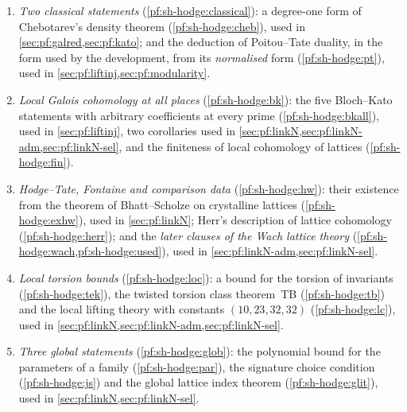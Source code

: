 \begin{enumerate}[label=(\roman*)]
\item \emph{Two classical statements} (\cref{pf:sh-hodge:classical}): a degree-one form of Chebotarev's density
  theorem (\cref{pf:sh-hodge:cheb}), used in \cref{sec:pf:galred,sec:pf:kato}; and the deduction of Poitou--Tate
  duality, in the form used by the development, from its \emph{normalised} form (\cref{pf:sh-hodge:pt}), used in
  \cref{sec:pf:liftinj,sec:pf:modularity}.
\item \emph{Local Galois cohomology at all places} (\cref{pf:sh-hodge:bk}): the five Bloch--Kato statements with
  arbitrary coefficients at every prime (\cref{pf:sh-hodge:bkall}), used in \cref{sec:pf:liftinj}, two corollaries
  used in \cref{sec:pf:linkN,sec:pf:linkN-adm,sec:pf:linkN-sel}, and the finiteness of local cohomology of lattices
  (\cref{pf:sh-hodge:fin}).
\item \emph{Hodge--Tate, Fontaine and comparison data} (\cref{pf:sh-hodge:hw}): their existence from the theorem of
  Bhatt--Scholze on crystalline lattices (\cref{pf:sh-hodge:exhw}), used in \cref{sec:pf:linkN}; Herr's description of
  lattice cohomology (\cref{pf:sh-hodge:herr}); and the \emph{later clauses of the Wach lattice theory}
  (\cref{pf:sh-hodge:wach,pf:sh-hodge:used}), used in \cref{sec:pf:linkN-adm,sec:pf:linkN-sel}.
\item \emph{Local torsion bounds} (\cref{pf:sh-hodge:loc}): a bound for the torsion of invariants
  (\cref{pf:sh-hodge:tek}), the twisted torsion class theorem~TB (\cref{pf:sh-hodge:tb}) and the local lifting theory with
  constants $(10,23,32,32)$ (\cref{pf:sh-hodge:lc}), used in \cref{sec:pf:linkN,sec:pf:linkN-adm,sec:pf:linkN-sel}.
\item \emph{Three global statements} (\cref{pf:sh-hodge:glob}): the polynomial bound for the parameters of a family
  (\cref{pf:sh-hodge:par}), the signature choice condition (\cref{pf:sh-hodge:js}) and the global lattice index theorem
  (\cref{pf:sh-hodge:glit}), used in \cref{sec:pf:linkN,sec:pf:linkN-sel}.
\end{enumerate}

